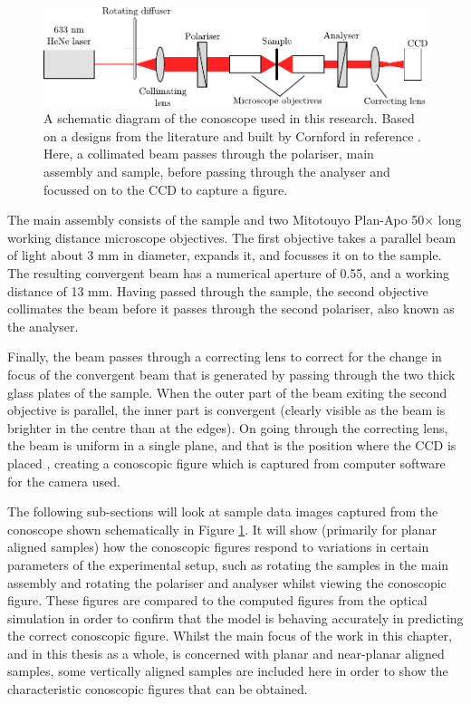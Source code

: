\begin{figure}
\begin{center}
\includegraphics{Figures/conoscopy/conoscope_setup}
\end{center}
\caption[Schematic diagram of the conoscope setup]{\label{fig:conoscope_schem}A schematic diagram of the conoscope used in this research. Based on a designs from the literature \cite{Parry-Jones2002,Fujikawa1993} and built by Cornford in reference \cite{Cornford2008}. Here, a collimated beam passes through the polariser, main assembly and sample, before passing through the analyser and focussed on to the CCD to capture a figure.}
\end{figure}

The main assembly consists of the sample and two Mitotouyo Plan-Apo 50$\times$ long working distance microscope objectives. The first objective takes a parallel beam of light about 3 mm in diameter, expands it, and focusses it on to the sample. The resulting convergent beam has a numerical aperture of 0.55, and a working distance of 13 mm. Having passed through the sample, the second objective collimates the beam before it passes through the second polariser, also known as the analyser.

Finally, the beam passes through a correcting lens to correct for the change in focus of the convergent beam that is generated by passing through the two thick glass plates of the sample. When the outer part of the beam exiting the second objective is parallel, the inner part is convergent (clearly visible as the beam is brighter in the centre than at the edges). On going through the correcting lens, the beam is uniform in a single plane, and that is the position where the CCD is placed \cite{Cornford2008}, creating a conoscopic figure which is captured from computer software for the camera used.

The following sub-sections will look at sample data images captured from the conoscope shown schematically in Figure \ref{fig:conoscope_schem}. It will show (primarily for planar aligned samples) how the conoscopic figures respond to variations in certain parameters of the experimental setup, such as rotating the samples in the main assembly and rotating the polariser and analyser whilst viewing the conoscopic figure. These figures are compared to the computed figures from the optical simulation in order to confirm that the model is behaving accurately in predicting the correct conoscopic figure. Whilst the main focus of the work in this chapter, and in this thesis as a whole, is concerned with planar and near-planar aligned samples, some vertically aligned samples are included here in order to show the characteristic conoscopic figures that can be obtained.

